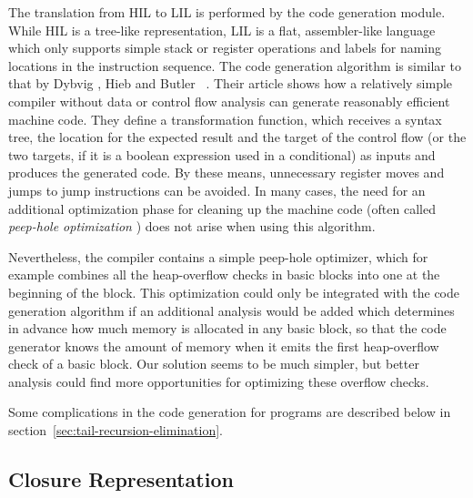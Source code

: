 The translation from HIL to LIL is performed by the code generation
module.  While HIL is a tree-like representation, LIL is a flat,
assembler-like language which only supports simple stack or register
operations and labels for naming locations in the instruction
sequence.  The code generation algorithm is similar to that by Dybvig%
,
Hieb%
 and Butler%
~\cite{dybvig90destination}.  Their article shows how a
relatively simple compiler without data or control flow analysis can
generate reasonably efficient machine code.  They define a
transformation function, which receives a syntax tree, the location
for the expected result and the target of the control flow (or the two
targets, if it is a boolean expression used in a conditional) as
inputs and produces the generated code.  By these means, unnecessary
register moves and jumps to jump instructions can be avoided.  In many
cases, the need for an additional optimization phase for cleaning up 
the machine code (often called {\em peep-hole optimization}%
) does not arise when using this
algorithm.

Nevertheless, the \turtle{} compiler contains a simple peep-hole
optimizer, which for example combines all the heap-overflow checks in
basic blocks into one at the beginning of the block.  This
optimization could only be integrated with the code generation
algorithm if an additional analysis would be added which determines in
advance how much memory is allocated in any basic block, so that the
code generator knows the amount of memory when it emits the first
heap-overflow check of a basic block.  Our solution seems to be much
simpler, but better analysis could find more opportunities for
optimizing these overflow checks.

Some complications in the code generation for \turtle{} programs are
described below in section~\ref{sec:tail-recursion-elimination}.


\subsection{Closure Representation}
\label{sec:closure-representation}


